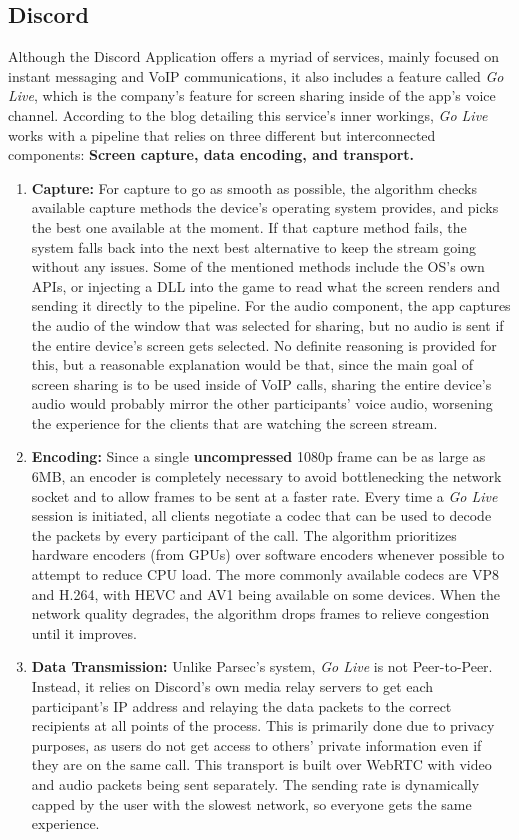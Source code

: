 \documentclass{article}
\begin{document}
    \subsection{Discord} 
    Although the Discord Application offers a myriad of services, mainly focused on instant messaging and VoIP communications, it also includes a feature called \textit{Go Live}, which is the company's feature for screen sharing inside of the app's voice channel. 
    According to the blog detailing this service's inner workings, \textit{Go Live} works with a pipeline that relies on three different but interconnected components: \textbf{Screen capture, data encoding, and transport.}~\cite{discord_streaming}
    \begin{enumerate}
        \item \textbf{Capture:} For capture to go as smooth as possible, the algorithm checks available capture methods the device's operating system provides, and picks the best one available at the moment. If that capture method fails, the system falls back 
        into the next best alternative to keep the stream going without any issues. Some of the mentioned methods include the OS's own APIs, or injecting a DLL into the game to read what the screen renders and sending it directly to the pipeline. For the audio component, 
        the app captures the audio of the window that was selected for sharing, but no audio is sent if the entire device's screen gets selected. No definite reasoning is provided for this, but a reasonable explanation would be that, since the main goal of screen sharing is to be used
        inside of VoIP calls, sharing the entire device's audio would probably mirror the other participants' voice audio, worsening the experience for the clients that are watching the screen stream. 
        \item \textbf{Encoding:} Since a single \textbf{uncompressed} 1080p frame can be as large as 6MB, an encoder is completely necessary to avoid bottlenecking the network socket and to allow frames to be sent at a faster rate. Every time a \textit{Go Live} session is initiated, all clients negotiate a
        codec that can be used to decode the packets by every participant of the call. The algorithm prioritizes hardware encoders (from GPUs) over software encoders whenever possible to attempt to reduce CPU load. The more commonly available codecs are VP8 and H.264, with HEVC and
        AV1 being available on some devices. When the network quality degrades, the algorithm drops frames to relieve congestion until it improves.  
        \item  \textbf{Data Transmission: } Unlike Parsec's system, \textit{Go Live} is not Peer-to-Peer. Instead, it relies on Discord's own media relay servers to get each participant's IP address and relaying the data packets to the correct recipients at all points of the process. This is primarily done
        due to privacy purposes, as users do not get access to others' private information even if they are on the same call. This transport is built over WebRTC with video and audio packets being sent separately. The sending rate is dynamically capped by the user with the slowest network, so everyone gets 
        the same experience.
    \end{enumerate}
\end{document}
